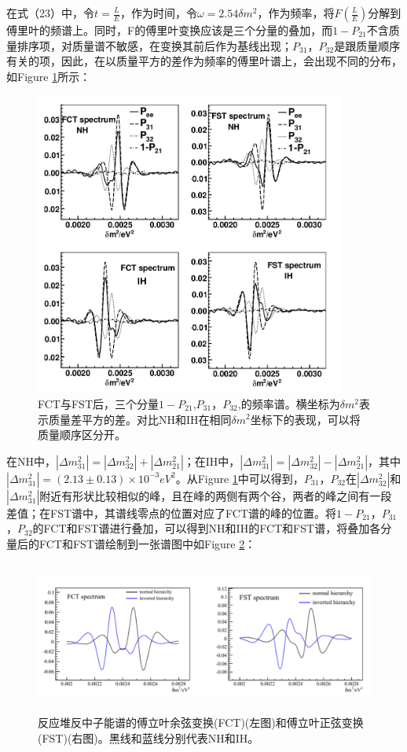 \documentclass[10pt,a4paper]{article}
\begin{document}
在式（23）中，令$t=\frac{L}{E}$，作为时间，令$\omega=2.54\delta m^2$，作为频率，将$F(\frac{L}{E})$分解到傅里叶的频谱上。同时，F的傅里叶变换应该是三个分量的叠加，而$1-P_{21}$不含质量排序项，对质量谱不敏感，在变换其前后作为基线出现；$P_{31}$，$P_{32}$是跟质量顺序有关的项，因此，在以质量平方的差作为频率的傅里叶谱上，会出现不同的分布，如Figure \ref{fig:1}所示\cite{Zhan:2008id}：
\begin{figure}[H]
 \centering
 \includegraphics[height=10cm]{images/diff-P31-P32.png}
 \caption{FCT与FST后，三个分量$1-P_{21}$,$P_{31}$，$P_{32}$,的频率谱。横坐标为$\delta m^2$表示质量差平方的差。对比NH和IH在相同$\delta m^2$坐标下的表现，可以将质量顺序区分开。}
 \label{fig:1}
\end{figure}


在NH中，$|\Delta m_{31}^2|=|\Delta m_{32}^2|+|\Delta m_{21}^2|$；在IH中，$|\Delta m_{31}^2|=|\Delta m_{32}^2|-|\Delta m_{21}^2|$，其中$|\Delta m_{31}^2|=(2.13 \pm 0.13) \times 10^{-3}{eV}^2 $。从Figure \ref{fig:1}中可以得到，$P_{31}$，$P_{32}$在$|\Delta m_{32}^2|$和$|\Delta m_{31}^2|$附近有形状比较相似的峰，且在峰的两侧有两个谷，两者的峰之间有一段差值；在FST谱中，其谱线零点的位置对应了FCT谱的峰的位置。将$1-P_{21}$，$P_{31}$，$P_{32}$的FCT和FST谱进行叠加，可以得到NH和IH的FCT和FST谱，将叠加各分量后的FCT和FST谱绘制到一张谱图中如Figure \ref{fig:2}\cite{2009Experimental}：
\begin{figure}[H]
 \centering
 \includegraphics[height=5cm]{images/傅里叶图谱.png}
 \caption{反应堆反中子能谱的傅立叶余弦变换(FCT)(左图)和傅立叶正弦变换(FST)(右图)。黑线和蓝线分别代表NH和IH。}
 \label{fig:2}
\end{figure}
\end{document}
